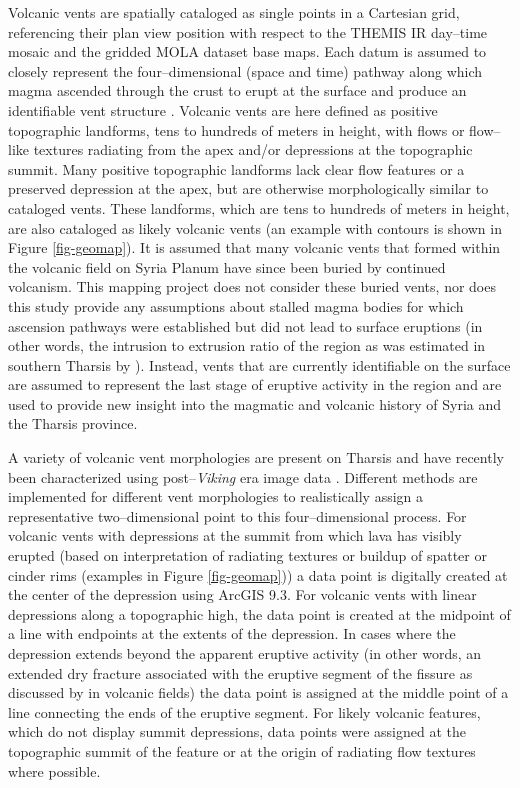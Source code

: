 Volcanic vents are spatially cataloged as single points in a Cartesian grid, referencing their plan view position with respect to the THEMIS IR day--time mosaic and the gridded MOLA dataset base maps. Each datum is assumed to closely represent the four--dimensional (space and time) pathway along which magma ascended through the crust to erupt at the surface and produce an identifiable vent structure \citep{Bishop2007}. Volcanic vents are here defined as positive topographic landforms, tens to hundreds of meters in height, with flows or flow--like textures radiating from the apex and/or depressions at the topographic summit. Many positive topographic landforms lack clear flow features or a preserved depression at the apex, but are otherwise morphologically similar to cataloged vents. These landforms, which are tens to hundreds of meters in height, are also cataloged as likely volcanic vents (an example with contours is shown in Figure \ref{fig-geomap}). It is assumed that many volcanic vents that formed within the volcanic field on Syria Planum have since been buried by continued volcanism. This mapping project does not consider these buried vents, nor does this study provide any assumptions about stalled magma bodies for which ascension pathways were established but did not lead to surface eruptions (in other words, the intrusion to extrusion ratio of the region as was estimated in southern Tharsis by \citet{Lillis2009}). Instead, vents that are currently identifiable on the surface are assumed to represent the last stage of eruptive activity in the region and are used to provide new insight into the magmatic and volcanic history of Syria and the Tharsis province.

A variety of volcanic vent morphologies are present on Tharsis and have recently been characterized using post--\textit{Viking} era image data \citep{Bleacher2007,Bleacher2009,Broz2012,Keszthelyi2008,Baptista2008,Hauber2009,Wilson2009,Baratoux2009}. Different methods are implemented for different vent morphologies to realistically assign a representative two--dimensional point to this four--dimensional process. For volcanic vents with depressions at the summit from which lava has visibly erupted (based on interpretation of radiating textures or buildup of spatter or cinder rims (examples in Figure \ref{fig-geomap})) a data point is digitally created  at the center of the depression using ArcGIS 9.3. For volcanic vents with linear depressions along a topographic high, the data point is created at the midpoint of a line with endpoints at the extents of the depression. In cases where the depression extends beyond the apparent eruptive activity (in other words, an extended dry fracture associated with the eruptive segment of the fissure as discussed by \citet{Greeley1977} in volcanic fields) the data point is assigned at the middle point of a line connecting the ends of the eruptive segment. For likely volcanic features, which do not display summit depressions, data points were assigned at the topographic summit of the feature or at the origin of radiating flow textures where possible.

